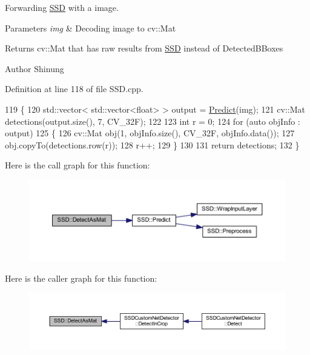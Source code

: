 Forwarding \mbox{\hyperlink{class_s_s_d}{S\+SD}} with a image. 


\begin{DoxyParams}{Parameters}
{\em img} & Decoding image to cv\+::\+Mat \\
\hline
\end{DoxyParams}
\begin{DoxyReturn}{Returns}
cv\+::\+Mat that has raw results from \mbox{\hyperlink{class_s_s_d}{S\+SD}} instead of Detected\+B\+Boxes 
\end{DoxyReturn}
\begin{DoxyAuthor}{Author}
Shinung 
\end{DoxyAuthor}


Definition at line 118 of file S\+S\+D.\+cpp.


\begin{DoxyCode}
119 \{
120     std::vector< std::vector<float> > output = \mbox{\hyperlink{class_s_s_d_a58c0ef81b4b24424fd967d90da5c6045}{Predict}}(img);
121     cv::Mat detections(output.size(), 7, CV\_32F);
122 
123     \textcolor{keywordtype}{int} r = 0;
124     \textcolor{keywordflow}{for} (\textcolor{keyword}{auto} objInfo : output)
125     \{
126         cv::Mat obj(1, objInfo.size(), CV\_32F, objInfo.data());
127         obj.copyTo(detections.row(r));
128         r++;
129     \}
130 
131     \textcolor{keywordflow}{return} detections;
132 \}
\end{DoxyCode}
Here is the call graph for this function\+:\nopagebreak
\begin{figure}[H]
\begin{center}
\leavevmode
\includegraphics[width=350pt]{class_s_s_d_a68c76ba1ebc94d222c1fd624db060f62_cgraph}
\end{center}
\end{figure}
Here is the caller graph for this function\+:\nopagebreak
\begin{figure}[H]
\begin{center}
\leavevmode
\includegraphics[width=350pt]{class_s_s_d_a68c76ba1ebc94d222c1fd624db060f62_icgraph}
\end{center}
\end{figure}
\mbox{\label{class_s_s_d_a20f17f5f9dbdc816f7b3ae4e30428427}} 
